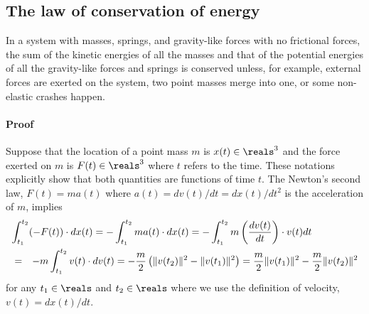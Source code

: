 \documentclass{article}
\begin{document}
\subsection{The law of conservation of energy}

In a system with masses, springs, and gravity-like forces with no frictional forces,
the sum of the kinetic energies of all the masses
and that of the potential energies of all the gravity-like forces and springs
is conserved
unless, for example, external forces are exerted on the system,
two point masses merge into one,
or some non-elastic crashes happen.

\paragraph{Proof}
\label{paragraph:proof}

Suppose that the location of a point mass $m$ is $x(t)\in\reals^3$
and the force exerted on $m$ is $F(t)\in\reals^3$ where $t$ refers to the time.
These notations explicitly show that both quantities are functions of time $t$.
The Newton's second law, $F(t) = m a(t)$ where $a(t) = dv(t)/dt = {dx(t)}/{dt^2}$ is the acceleration of $m$,
implies
\begin{eqnarray}
\nonumber
\lefteqn{
\int_{t_1}^{t_2} (-F(t)) \cdot d x(t)
=
	- \int_{t_1}^{t_2} m a(t) \cdot d x(t)
=
	- \int_{t_1}^{t_2} m \left( \frac{dv(t)}{dt} \right) \cdot v(t) dt
}
\\
&=&
	- m \int_{t_1}^{t_2} {v(t)} \cdot dv(t)
=
	- \frac{m}{2}\left(
		\|v(t_2)\|^2 - \|v(t_1)\|^2
	\right)
=
	\frac{m}{2} \|v(t_1)\|^2
	- \frac{m}{2} \|v(t_2)\|^2
\label{eq:energy:conserve:1}
\end{eqnarray}
for any $t_1\in\reals$ and $t_2\in\reals$
where we use the definition of velocity,
$v(t) = {dx(t)}/{dt}$.
\end{document}
